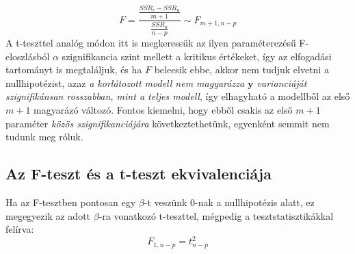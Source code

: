\documentclass[14p]{report}
\def\pmb{\boldsymbol}
\newcounter{y}
\newcounter{z}
\begin{document}
	\[
		F = \frac{\frac{SSR_r - SSR_u}{m+1}}{\frac{SSR_u}{n-p}} \sim F_{m+1,n-p}
	\]
	A t-teszttel analóg módon itt is megkeressük az ilyen paraméterezésű F-eloszlásból $\alpha$ szignifikancia szint mellett a kritikus értékeket, így az elfogadási tartományt is megtaláljuk, és ha $F$ beleesik ebbe, akkor nem tudjuk elvetni a nullhipotézist, azaz \emph{a korlátozott modell nem magyarázza $\pmb{y}$ varianciáját szignifikánsan rosszabban, mint a teljes modell}, így elhagyható a modellből az első $m+1$ magyarázó változó. Fontos kiemelni, hogy ebből csakis az első $m+1$ paraméter \emph{közös szignifikanciájára} következtethetünk, egyenként semmit nem tudunk meg róluk.
	\subsection{Az F-teszt és a t-teszt ekvivalenciája}
	Ha az F-tesztben pontosan egy $\beta$-t veszünk $0$-nak a nullhipotézis alatt, ez megegyezik az adott $\beta$-ra vonatkozó t-teszttel, mégpedig a tesztstatisztikákkal felírva:
	\[
		F_{1,n-p} = t^2_{n-p}
	\]
\end{document}
